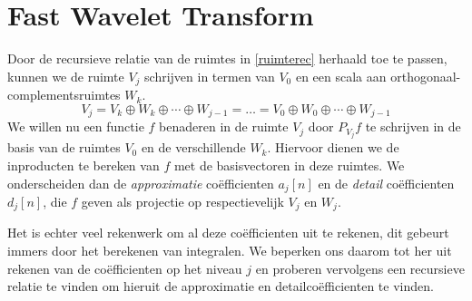 \documentclass[11pt]{report}
\theoremstyle{plain}
\theoremstyle{remark}
\begin{document}
\section{Fast Wavelet Transform}

Door de recursieve relatie van de ruimtes in \ref{ruimterec} herhaald toe te passen, 
kunnen we de ruimte $V_j$ schrijven in termen van $V_0$ en een scala aan 
orthogonaal-complementsruimtes $W_k$.
\begin{equation}
  \label{ruimte_splitsing}
	V_j = V_k \oplus W_k \oplus \cdots \oplus W_{j-1} = \ldots 
        = V_0 \oplus W_0 \oplus \cdots \oplus W_{j-1}
\end{equation}
We willen nu een functie $f$ benaderen in de ruimte $V_j$ door $P_{V_j}f$ te schrijven in 
de basis van de ruimtes $V_0$ en de verschillende $W_k$. Hiervoor dienen we de inproducten
te bereken van $f$ met de basisvectoren in deze ruimtes.
We onderscheiden dan de \emph{approximatie} 
co\"efficienten $a_j[n]$ en de \emph{detail} co\"efficienten $d_j[n]$, die
$f$ geven als projectie op  respectievelijk $V_j$ en $W_j$.

Het is echter veel rekenwerk om al deze co\"efficienten uit te rekenen, dit gebeurt immers
door het berekenen van integralen. We beperken ons daarom tot her uit rekenen van de 
co\"efficienten op het niveau $j$ en proberen vervolgens een recursieve relatie te vinden
om hieruit de approximatie en detailco\"efficienten te vinden.
 
\end{document}
